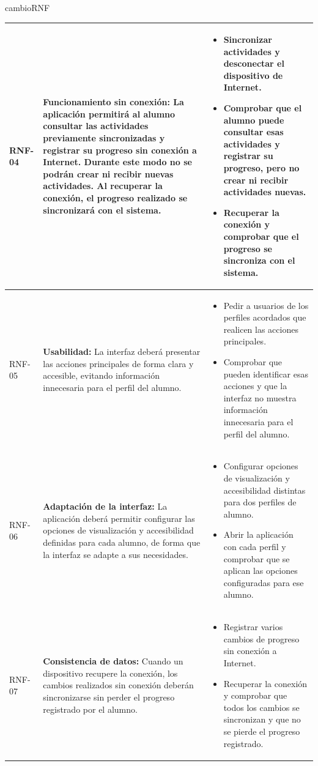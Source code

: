 \begin{cambiocontenido}{cambioRNF}
\begin{longtable}{|>{\raggedright\arraybackslash}p{1.4cm}|>{\raggedright\arraybackslash}p{5.5cm}|>{\raggedright\arraybackslash}p{7.8cm}|}
\hline
\hypertarget{rnf-04}{}RNF-04 & \textbf{Funcionamiento sin conexión:} La aplicación permitirá al alumno consultar las actividades previamente sincronizadas y registrar su progreso sin conexión a Internet. Durante este modo no se podrán crear ni recibir nuevas actividades. Al recuperar la conexión, el progreso realizado se sincronizará con el sistema. & \begin{itemize}[nosep,leftmargin=*]\item Sincronizar actividades y desconectar el dispositivo de Internet. \item Comprobar que el alumno puede consultar esas actividades y registrar su progreso, pero no crear ni recibir actividades nuevas. \item Recuperar la conexión y comprobar que el progreso se sincroniza con el sistema.\end{itemize} \\
\hline
\hypertarget{rnf-05}{}RNF-05 & \textbf{Usabilidad:} La interfaz deberá presentar las acciones principales de forma clara y accesible, evitando información innecesaria para el perfil del alumno. & \begin{itemize}[nosep,leftmargin=*]\item Pedir a usuarios de los perfiles acordados que realicen las acciones principales. \item Comprobar que pueden identificar esas acciones y que la interfaz no muestra información innecesaria para el perfil del alumno.\end{itemize} \\
\hline
\hypertarget{rnf-06}{}RNF-06 & \textbf{Adaptación de la interfaz:} La aplicación deberá permitir configurar las opciones de visualización y accesibilidad definidas para cada alumno, de forma que la interfaz se adapte a sus necesidades. & \begin{itemize}[nosep,leftmargin=*]\item Configurar opciones de visualización y accesibilidad distintas para dos perfiles de alumno. \item Abrir la aplicación con cada perfil y comprobar que se aplican las opciones configuradas para ese alumno.\end{itemize} \\
\hline
\hypertarget{rnf-07}{}RNF-07 & \textbf{Consistencia de datos:} Cuando un dispositivo recupere la conexión, los cambios realizados sin conexión deberán sincronizarse sin perder el progreso registrado por el alumno. & \begin{itemize}[nosep,leftmargin=*]\item Registrar varios cambios de progreso sin conexión a Internet. \item Recuperar la conexión y comprobar que todos los cambios se sincronizan y que no se pierde el progreso registrado.\end{itemize} \\

\end{longtable}
\end{cambiocontenido}
